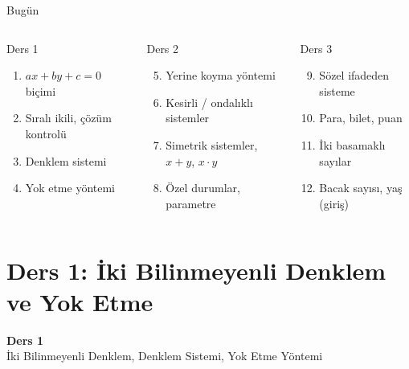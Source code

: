 \documentclass[aspectratio=169,11pt]{beamer}
\begin{document}
\begin{frame}{Bugün}
\begin{columns}[t]
\begin{block}{Ders 1}
\begin{enumerate}
\item \(ax+by+c=0\) biçimi
\item Sıralı ikili, çözüm kontrolü
\item Denklem sistemi
\item Yok etme yöntemi
\end{enumerate}
\end{block}
\begin{block}{Ders 2}
\begin{enumerate}\setcounter{enumi}{4}
\item Yerine koyma yöntemi
\item Kesirli / ondalıklı sistemler
\item Simetrik sistemler, \(x+y\), \(x\cdot y\)
\item Özel durumlar, parametre
\end{enumerate}
\end{block}
\begin{block}{Ders 3}
\begin{enumerate}\setcounter{enumi}{8}
\item Sözel ifadeden sisteme
\item Para, bilet, puan
\item İki basamaklı sayılar
\item Bacak sayısı, yaş (giriş)
\end{enumerate}
\end{block}
\end{columns}
\end{frame}

\section{Ders 1: İki Bilinmeyenli Denklem ve Yok Etme}
\begin{frame}
\centering\Large\color{anamavi}\textbf{Ders 1}\\[6pt]\normalsize İki Bilinmeyenli Denklem, Denklem Sistemi, Yok Etme Yöntemi
\end{frame}
\end{document}
